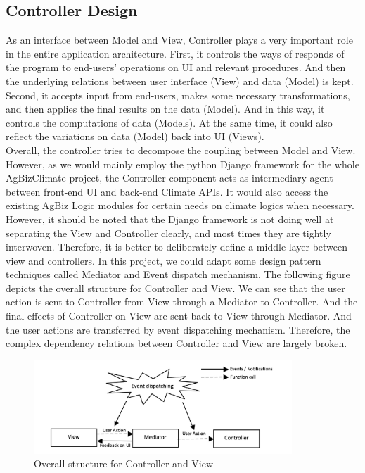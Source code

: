 \documentclass[onecolumn, draftclsnofoot,10pt, compsoc]{article}
\begin{document}
	\subsection{Controller Design}
	As an interface between Model and View, Controller plays a very important role in the entire application architecture. First, it controls the ways of responds of the program to end-users' operations on UI and relevant procedures. And then the underlying relations between user interface (View) and data (Model) is kept. Second, it accepts input from end-users, makes some necessary transformations, and then applies the final results on the data (Model). And in this way, it controls the computations of data (Models). At the same time, it could also reflect the variations on data (Model) back into UI (Views). \\
	Overall, the controller tries to decompose the coupling between Model and View. However, as we would mainly employ the python Django framework for the whole AgBizClimate project, the Controller component acts as intermediary agent between front-end UI and back-end Climate APIs. It would also access the existing AgBiz Logic modules for certain needs on climate logics when necessary. However, it should be noted that the Django framework is not doing well at separating the View and Controller clearly, and most times they are tightly interwoven. Therefore, it is better to deliberately define a middle layer between view and controllers. In this project, we could adapt some design pattern techniques called Mediator and Event dispatch mechanism. The following figure depicts the overall structure for Controller and View. We can see that the user action is sent to Controller from View through a Mediator to Controller. And the final effects of Controller on View are sent back to View through Mediator. And the user actions are transferred by event dispatching mechanism. Therefore, the complex dependency relations between Controller and View are largely broken.\\
	\begin{figure}[htb]
		\begin{center}
			\includegraphics[width=275pt]{UMLDiagrams/Controller.jpeg}
		\end{center}
		\caption{Overall structure for Controller and View}
		\label{fig:UD1}
	\end{figure}
\end{document}
